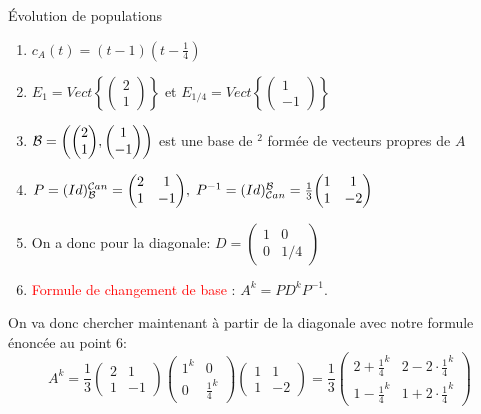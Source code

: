 \begin{parag}{Évolution de populations}
\begin{enumerate}
    \item $c_A(t) = (t-1)(t-\frac{1}{4})$
    \item $E_1 = Vect\left\{\begin{pmatrix}
        2 \\ 1
    \end{pmatrix}\right\}$ et $E_{1/4} = Vect\left\{\begin{pmatrix}
        1 \\ -1
    \end{pmatrix}\right\}$
    \item $\bmath = \left(\begin{pmatrix}
        2\\1
    \end{pmatrix}, \begin{pmatrix}
        1 \\ -1
    \end{pmatrix}\right)$ est une base de \R$^2$ formée de vecteurs propres de $A$
    \item $P = (Id)_\bmath^{\cmath an} = \begin{pmatrix}
        2 & 1 \\ 1 & -1
    \end{pmatrix},\; P^{-1} = (Id)_{\cmath an}^\bmath = \frac{1}{3}\begin{pmatrix}
        1 & 1 \\ 1 & -2
    \end{pmatrix}$
    \item On a donc pour la diagonale: $D = \begin{pmatrix}
        1 & 0 \\ 0 & 1/4
    \end{pmatrix}$
    \item \textcolor{red}{Formule de changement de base } : $A^k = PD^kP^{-1}$.
\end{enumerate}
On va donc chercher maintenant à partir de la diagonale avec notre formule énoncée au point $6$:
\[A^k = \frac{1}{3}\begin{pmatrix}
    2 & 1 \\ 1 & -1
\end{pmatrix}\begin{pmatrix}
    1^k & 0 \\ 0 & \frac{1}{4}^k
\end{pmatrix}\begin{pmatrix}
    1 & 1 \\ 1 & -2
\end{pmatrix}
= \frac{1}{3}{\begin{pmatrix}
    2+\frac{1}{4}^k & 2 - 2\cdot\frac{1}{4}^k\\
    1 - \frac{1}{4}^k & 1 + 2\cdot\frac{1}{4}^k
\end{pmatrix}}\]


\end{parag}
